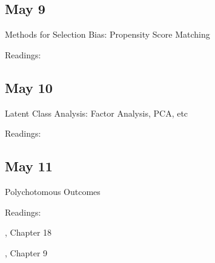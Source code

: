 \documentclass[10pt]{article}
\begin{document}
\subsection{May 9}

Methods for Selection Bias: Propensity Score Matching

Readings: 

\begin{description}


\item {}

\item {}

\item {}

\item {}

\item {}

\end{description}


\subsection{May 10}


Latent Class Analysis: Factor Analysis, PCA, etc

Readings:

\begin{description}

\item {}
\item {}

\item {}

\item {}

\end{description}


\subsection{May 11}

Polychotomous Outcomes

Readings:


\begin{description}


\item {}

\item {}, Chapter 18

\item {}, Chapter 9

\end{description}
\end{document}
